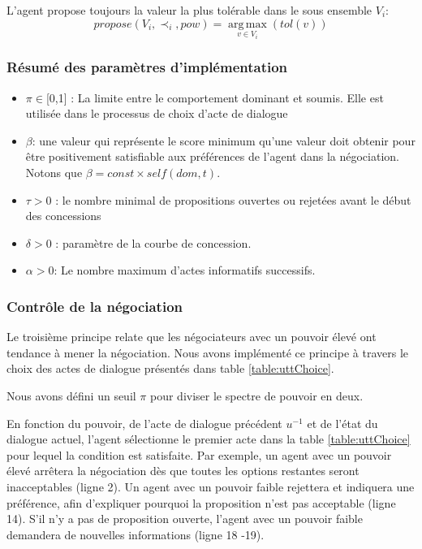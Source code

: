 		\noindent
		L'agent propose toujours la valeur la plus tolérable dans le sous ensemble $V_i$:
		\begin{equation}
		propose(V_i, \prec_i,pow) =  \operatorname*{arg\,max}_{v \in V_i} ( tol(v))
		\end{equation}
		
		
			\subsubsection*{Résumé des paramètres d'implémentation }
			\begin{itemize}[noitemsep]
				
				\item $\pi \in $[0,1] : La limite entre le comportement dominant et soumis. Elle est utilisée dans le processus de choix d'acte de dialogue
				\item $\beta$:  une valeur qui représente le score minimum qu'une valeur doit obtenir pour être positivement satisfiable aux préférences de l'agent dans la négociation. Notons que $\beta = const \times self(dom,t)$.
				\item $\tau > 0$ : le nombre minimal de propositions ouvertes ou rejetées avant le début des concessions
				\item $\delta > 0$ : paramètre de la courbe de concession.
				\item $\alpha> 0$: Le nombre maximum d'actes informatifs successifs.
			\end{itemize}
		
		\subsubsection {Contrôle de la négociation}
		Le troisième principe relate que les négociateurs avec un pouvoir élevé ont tendance à mener la négociation. Nous avons implémenté ce principe à travers le choix des actes de dialogue présentés dans table \ref {table:uttChoice}.
		
		Nous avons défini un seuil $ \pi $ pour diviser le spectre de pouvoir en deux.
		
		En fonction du pouvoir, de l'acte de dialogue précédent $ u ^ {- 1} $ et de l'état du dialogue actuel, l'agent sélectionne le premier acte dans la table \ref {table:uttChoice} pour lequel la condition est satisfaite. 
		Par exemple, un agent avec un pouvoir élevé arrêtera la négociation dès que toutes les options restantes seront inacceptables (ligne 2). Un agent avec un pouvoir faible rejettera et indiquera une préférence, afin d'expliquer pourquoi la proposition n'est pas acceptable (ligne 14). S'il n'y a pas de proposition ouverte, l'agent avec un pouvoir faible demandera de nouvelles informations (ligne 18 -19).
		
